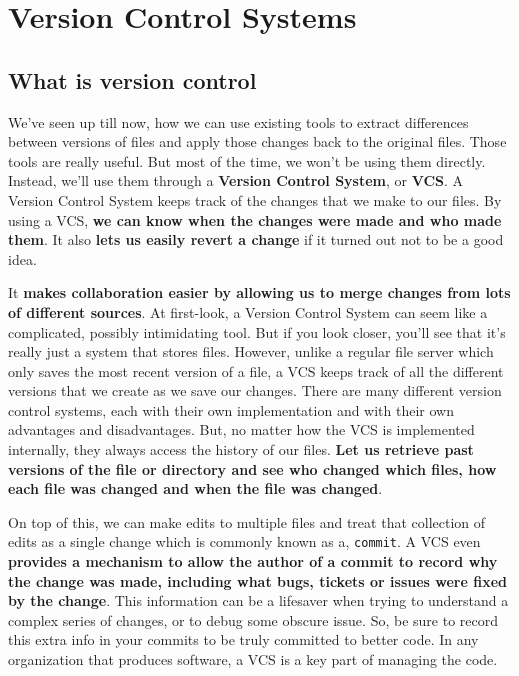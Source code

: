 \section{Version Control Systems}

	\subsection{What is version control}
	
	We've seen up till now, how we can use existing tools to extract differences between versions of files and apply those changes back to the original files. Those tools are really useful. But most of the time, we won't be using them directly. Instead, we'll use them through a \textbf{Version Control System}, or \textbf{VCS}. A Version Control System keeps track of the changes that we make to our files. By using a VCS, \textbf{we can know when the changes were made and who made them}. It also \textbf{lets us easily revert a change} if it turned out not to be a good idea. 
	
	It \textbf{makes collaboration easier by allowing us to merge changes from lots of different sources}. At first-look, a Version Control System can seem like a complicated, possibly intimidating tool. But if you look closer, you'll see that it's really just a system that stores files. 
	However, unlike a regular file server which only saves the most recent version of a file, a VCS keeps track of all the different versions that we create as we save our changes. There are many different version control systems, each with their own implementation and with their own advantages and disadvantages. But, no matter how the VCS is implemented internally, they always access the history of our files. \textbf{Let us retrieve past versions of the file or directory and see who changed which files, how each file was changed and when the file was changed}. 
	
	On top of this, we can make edits to multiple files and treat that collection of edits as a single change which is commonly known as a, \texttt{commit}. A VCS even \textbf{provides a mechanism to allow the author of a commit to record why the change was made, including what bugs, tickets or issues were fixed by the change}. 
	This information can be a lifesaver when trying to understand a complex series of changes, or to debug some obscure issue. So, be sure to record this extra info in your commits to be truly committed to better code. In any organization that produces software, a VCS is a key part of managing the code. 
	
